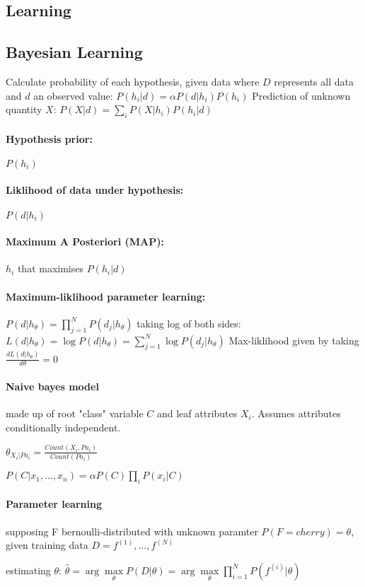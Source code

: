 \begin{multicols}{4}
\section{Learning}
\subsection{Bayesian Learning}
Calculate probability of each hypothesis, given data where $D$ represents all data and $d$ an observed value: $P(h_i|d) = \alpha P(d|h_i)P(h_i)$
Prediction of unknown quantity $X$: $P(X|d) = \sum\limits_i P(X|h_i)P(h_i|d)$
\paragraph{Hypothesis prior:} $P(h_i)$
\paragraph{Liklihood of data under hypothesis:} $P(d|h_i)$
\paragraph{Maximum A Posteriori (MAP):} $h_i$ that maximises $P(h_i|d)$

\paragraph{Maximum-liklihood parameter learning:} $P(d|h_{\theta}) = \prod\limits_{j=1}^{N}P(d_j|h_{\theta})$ taking log of both sides: $L(d|h_{\theta}) = \log P(d|h_{\theta}) = \sum\limits_{j=1}^{N} \log P(d_j|h_{\theta})$ Max-liklihood given by taking $\frac{dL(d|h_{\theta})}{d\theta} = 0$

\paragraph{Naive bayes model} made up of root "class" variable $C$ and leaf attributes $X_i$. Assumes attributes conditionally independent.

$\theta_{X_i|Pa_i} = \frac{Count(X_i,Pa_i)}{Count(Pa_i)}$

$P(C|x_1,\dots,x_n) = \alpha P(C)\prod\limits_{i}P(x_i|C)$

\paragraph{Parameter learning} supposing F bernoulli-distributed with unknown paramter $P(F=cherry) = \theta$, given training data $D={f^{(1)},\dots,f^{(N)}}$

estimating $\theta$: $\hat{\theta} = \arg\max\limits_{\theta} P(D|\theta) = \arg\max\limits_{\theta} \prod\limits_{i=1}^{N}P(f^{(i)}|\theta)$

\end{multicols}
